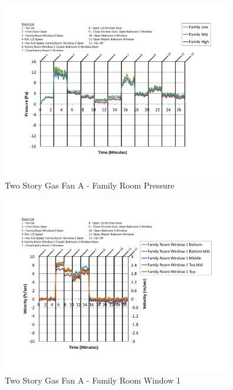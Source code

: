 \documentclass{article}
\begin{document}
\begin{appendices}
	\begin{figure}[H]
		\centering
		\includegraphics[height=3.05in,trim=0.67in 1.1in 0.67in 0.8in,clip=true]{0_Images/Results_Charts/ColdFlow/Two_Story/Gas/A/Family_Room_Pressure.pdf}
		\caption{Two Story Gas Fan A - Family Room Pressure}
	\end{figure}
 

	\begin{figure}[H]
		\centering
		\includegraphics[height=3.05in,trim=0.67in 1.1in 0.67in 0.8in,clip=true]{0_Images/Results_Charts/ColdFlow/Two_Story/Gas/A/Family_Room_Window_1.pdf}
		\caption{Two Story Gas Fan A - Family Room Window 1}
	\end{figure}
 
	\clearpage


\end{appendices}
\end{document}

